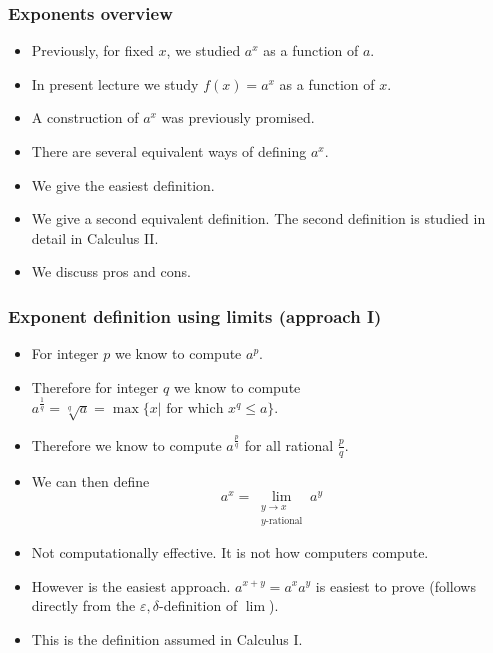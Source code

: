 \begin{frame}
\frametitle{Exponents overview}
\begin{itemize}
\item<1-> Previously, for fixed $x$, we studied $a^{x}$ as a function of $a$. 
\item<2-> In present lecture we study $f(x)=a^x$ as a function of $x$.
\item<3-> A construction of $a^x$ was previously promised.
\item<4-> There are several equivalent ways of defining $a^x$. 
\item<5-> We give the easiest definition. 
\item<6-> We give a second equivalent definition. The second definition is studied in detail in Calculus II. 
\item<7->We discuss pros and cons.
\end{itemize}
\end{frame}
\begin{frame}
\frametitle{Exponent definition using limits (approach I)}
\begin{itemize}
\item<1-> For integer $p$ we know to compute $a^p$.
\item<2-> Therefore for integer $q$ we know to compute $a^{\frac{1}{q}}= \sqrt[q]{a}=\max\{x|\text{~for~which~} x^q\leq a\}$.
\item<3-> Therefore we know to compute $a^{\frac{p}{q}}$ for all rational $\frac{p}{q}$.
\item<4-> We can then define
\[
a^x = \lim\limits_{\substack{y \to x \\ y\text{-rational}}} a^y 
\]
\item<5-> Not computationally effective. It is not how computers compute.
\item<6-> However is the easiest approach. $a^{x+y}=a^xa^y$ is easiest to prove (follows directly from the $\varepsilon, \delta$-definition of $\lim$).
\item<7->\alert<7->{This is the definition assumed in Calculus I.}
\end{itemize}
\end{frame}
